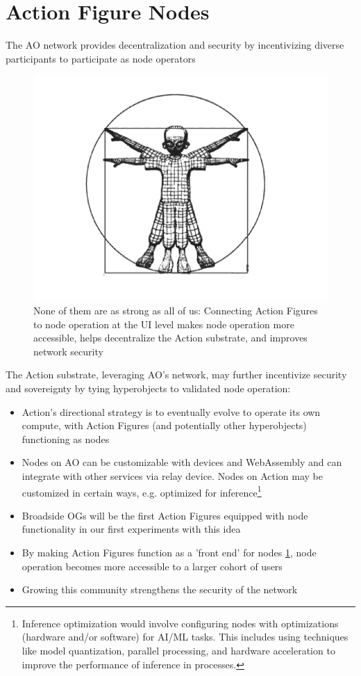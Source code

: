 \section{Action Figure Nodes}

The AO network provides decentralization and security by incentivizing diverse participants to participate as node operators

\begin{figure}[h]
  \centering
  \includegraphics[width=\columnwidth]{images/image12.png}
  \caption{None of them are as strong as all of us: Connecting Action Figures to node operation at the UI level makes node operation more accessible, helps decentralize the Action substrate, and improves network security}
  \label{fig:action_figure_nodes}
\end{figure}

The Action substrate, leveraging AO's network, may further incentivize security and sovereignty by tying hyperobjects to validated node operation:

\begin{itemize}
\item Action's directional strategy is to eventually evolve to operate its own compute, with Action Figures (and potentially other hyperobjects) functioning as nodes
\item Nodes on AO can be customizable with devices and WebAssembly and can integrate with other services via relay device. Nodes on Action may be customized in certain ways, e.g. optimized for inference\footnote{Inference optimization would involve configuring nodes with optimizations (hardware and/or software) for AI/ML tasks. This includes using techniques like model quantization, parallel processing, and hardware acceleration to improve the performance of inference in processes.}
\item Broadside OGs will be the first Action Figures equipped with node functionality in our first experiments with this idea
\item By making Action Figures function as a 'front end' for nodes \ref{fig:action_figure_nodes}, node operation becomes more accessible to a larger cohort of users
\item Growing this community strengthens the security of the network
\end{itemize}
